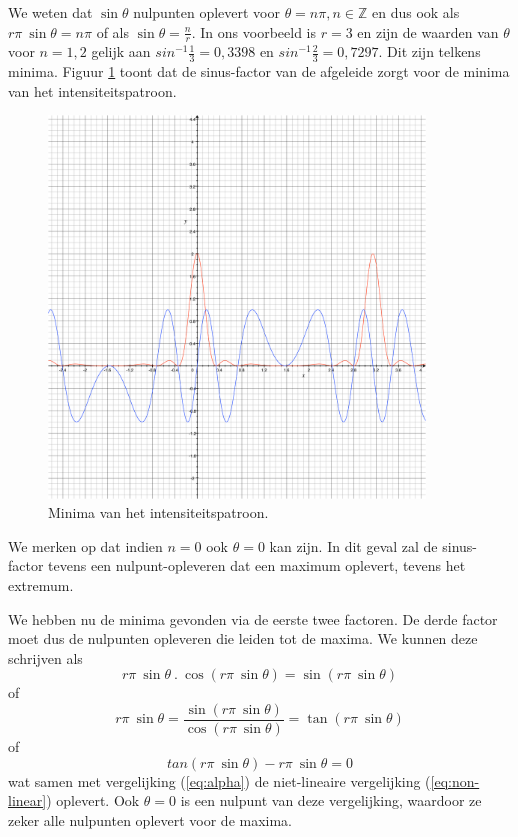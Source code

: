 \documentclass[12pt,a4paper]{article}
\begin{document}
We weten dat $\sin\theta$ nulpunten oplevert voor $\theta = n \pi, n \in \mathbb{Z}$ en dus ook als $r \pi \ \sin\theta = n \pi$ of als $\sin \theta = \frac{n}{r}$. In ons voorbeeld is $r=3$ en zijn de waarden van $\theta$ voor $n = 1, 2$ gelijk aan $sin^{-1} \frac{1}{3} = 0,3398$ en $sin^{-1} \frac{2}{3} = 0,7297$. Dit zijn telkens minima. Figuur \ref{fig:minima} toont dat de sinus-factor van de afgeleide zorgt voor de minima van het intensiteitspatroon.

\begin{figure}
\begin{center}
 \includegraphics[width=100mm]{resources/minima.pdf}
 \caption{Minima van het intensiteitspatroon.}
  \label{fig:minima}
\end{center}
\end{figure}

We merken op dat indien $n = 0$ ook $\theta = 0$ kan zijn. In dit geval zal de sinus-factor tevens een nulpunt-opleveren dat een maximum oplevert, tevens het extremum.

We hebben nu de minima gevonden via de eerste twee factoren. De derde factor moet dus de nulpunten opleveren die leiden tot de maxima. We  kunnen deze schrijven als
\begin{equation} \label{eq:maxima}
r \pi \ \sin \theta \ . \ \cos( r \pi \ \sin \theta) = \sin( r \pi \ \sin \theta)
\end{equation}
of
\begin{equation} \label{eq:maxima2}
r \pi \ \sin \theta = \frac{\sin( r \pi \ \sin \theta)}{\cos( r \pi \ \sin \theta)} = \tan(r \pi \ \sin \theta)
\end{equation}
of
\begin{equation} \label{eq:maxima3}
tan(r \pi \ \sin \theta) - r \pi \ \sin \theta = 0
\end{equation}
wat samen met vergelijking (\ref{eq:alpha}) de niet-lineaire vergelijking (\ref{eq:non-linear}) oplevert. Ook $\theta = 0$ is een nulpunt van deze vergelijking, waardoor ze zeker alle nulpunten oplevert voor de maxima.
\end{document}
